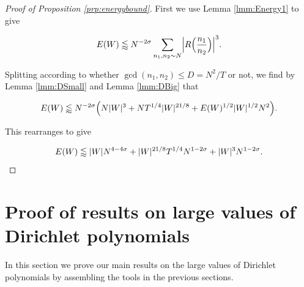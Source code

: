 \documentclass{amsart}
\theoremstyle{plain}
\numberwithin{equation}{section}
\begin{document}
%
%


\begin{proof}[Proof of Proposition \ref{prp:energybound}]
First we use Lemma \ref{lmm:Energy1} to give

\[
E(W)\lessapprox N^{-2\sigma}\sum_{n_1,n_2\sim N}\Bigl|R\Bigl(\frac{n_1}{n_2}\Bigr)\Bigr|^3.
\]

Splitting according to whether $\gcd(n_1,n_2)\le D=N^2/T$ or not, we find by Lemma \ref{lmm:DSmall} and Lemma \ref{lmm:DBig} that

\[
E(W)\lessapprox N^{-2\sigma}\Bigl(N|W|^3+NT^{1/4}|W|^{21/8}+E(W)^{1/2}|W|^{1/2}N^2\Bigr).
\]

This rearranges to give

\[
E(W)\lessapprox |W|N^{4-4\sigma}+|W|^{21/8}T^{1/4}N^{1-2\sigma}+|W|^3N^{1-2\sigma}.\qedhere
\]
\end{proof}


%
%
%
%


\section{Proof of results on large values of Dirichlet polynomials}

In this section we prove our main results on the large values of Dirichlet polynomials by assembling the tools in the previous sections.
\end{document}
